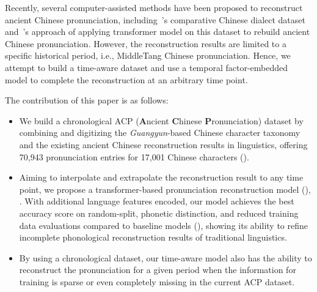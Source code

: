     Recently, several computer-assisted methods have been proposed to reconstruct ancient Chinese pronunciation, including~\citet{chang_wikihan_2022}'s comparative Chinese dialect dataset and~\citet{kim_transformed_2023}'s approach of applying transformer model on this dataset to rebuild ancient Chinese pronunciation. However, the reconstruction results are limited to a specific historical period, i.e., MiddleTang Chinese pronunciation. Hence, we attempt to build a time-aware dataset and use a temporal factor-embedded model to complete the reconstruction at an arbitrary time point.  

The contribution of this paper is as follows:
\begin{itemize}
\item We build a chronological ACP (\textbf{A}ncient \textbf{C}hinese \textbf{P}ronunciation) dataset by combining and digitizing the \textit{Guangyun}-based Chinese character taxonomy and the existing ancient Chinese reconstruction results in linguistics, offering 70,943 pronunciation entries for 17,001 Chinese characters (). 
\item Aiming to interpolate and extrapolate the reconstruction result to any time point, we propose a transformer-based pronunciation reconstruction model (), . With additional language features encoded, our model achieves the best accuracy score on random-split, phonetic distinction, and reduced training data evaluations compared to baseline models (), showing its ability to refine incomplete phonological reconstruction results of traditional linguistics. 
\item By using a chronological dataset, our time-aware model also has the ability to reconstruct the pronunciation for a given period when the information for training is sparse or even completely missing in the current ACP dataset. 
\end{itemize}
